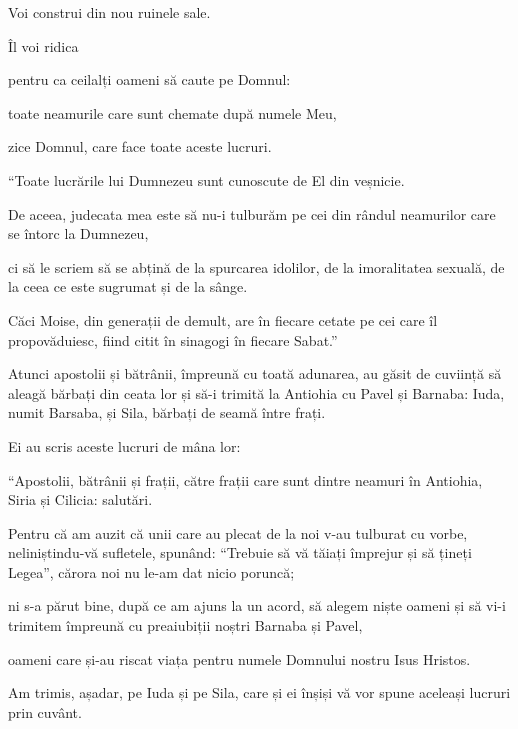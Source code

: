 {\par }{\Q Voi construi din nou ruinele sale.

\par }{\Q Îl voi ridica

pentru ca ceilalți oameni să caute pe Domnul:

\par }{\Q toate neamurile care sunt chemate după numele Meu,

\par }{\Q zice Domnul, care face toate aceste lucruri.


\par }{\PP {}“Toate lucrările lui Dumnezeu sunt cunoscute de El din veșnicie.

De aceea, judecata mea este să nu-i tulburăm pe cei din rândul neamurilor care se întorc la Dumnezeu,

ci să le scriem să se abțină de la spurcarea idolilor, de la imoralitatea sexuală, de la ceea ce este sugrumat și de la sânge.

Căci Moise, din generații de demult, are în fiecare cetate pe cei care îl propovăduiesc, fiind citit în sinagogi în fiecare Sabat.”


\par }{\PP {}Atunci apostolii și bătrânii, împreună cu toată adunarea, au găsit de cuviință să aleagă bărbați din ceata lor și să-i trimită la Antiohia cu Pavel și Barnaba: Iuda, numit Barsaba, și Sila, bărbați de seamă între frați.

Ei au scris aceste lucruri de mâna lor:

\par }{\PP “Apostolii, bătrânii și frații, către frații care sunt dintre neamuri în Antiohia, Siria și Cilicia: salutări.

Pentru că am auzit că unii care au plecat de la noi v-au tulburat cu vorbe, neliniștindu-vă sufletele, spunând: “Trebuie să vă tăiați împrejur și să țineți Legea”, cărora noi nu le-am dat nicio poruncă;

ni s-a părut bine, după ce am ajuns la un acord, să alegem niște oameni și să vi-i trimitem împreună cu preaiubiții noștri Barnaba și Pavel,

oameni care și-au riscat viața pentru numele Domnului nostru Isus Hristos.

Am trimis, așadar, pe Iuda și pe Sila, care și ei înșiși vă vor spune aceleași lucruri prin cuvânt.

}
